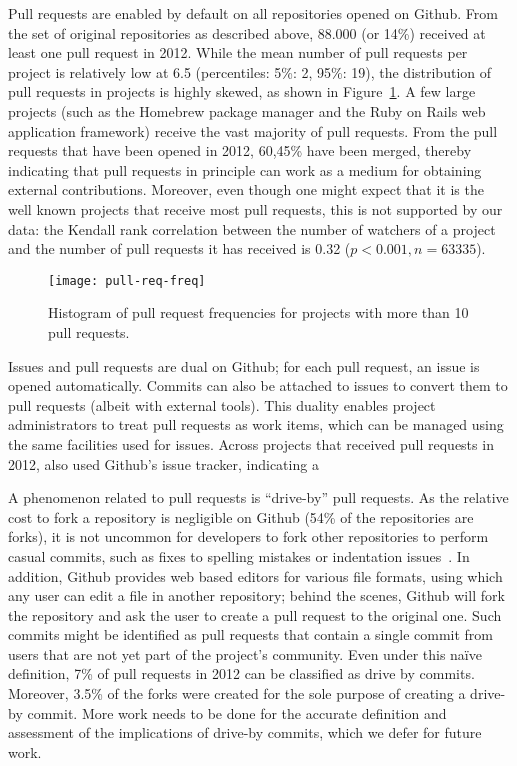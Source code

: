 \documentclass{sig-alternate}
\begin{document}
Pull requests are enabled by default on all repositories opened on Github.  From
the set of original repositories as described above, 88.000 (or 14\%) received
at least one pull request in 2012.  While the mean number of pull requests per
project is relatively low at 6.5 (percentiles: 5\%: 2, 95\%: 19), the
distribution of pull requests in projects is highly skewed, as shown in
Figure~\ref{fig:prfreq}.  A few large projects (such as the Homebrew package
manager and the Ruby on Rails web application framework) receive the vast
majority of pull requests. From the pull requests that have been opened in
2012, 60,45\% have been merged, thereby indicating that pull requests in
principle can work as a medium for obtaining external contributions.  Moreover,
even though one might expect that it is the well known projects that receive
most pull requests, this is not supported by our data: the Kendall rank
correlation between the number of watchers of a project and the number of pull
requests it has received is 0.32 ($p < 0.001, n = 63335$).

\begin{figure}
  \begin{center}
    \texttt{[image: pull-req-freq]}
  \end{center}
  \caption{Histogram of pull request frequencies for projects with more than
  10 pull requests.}
  \label{fig:prfreq}
\end{figure}

Issues and pull requests are dual on Github; for each pull request, an
issue is opened automatically. Commits can also be attached to issues to
convert them to pull requests (albeit with external tools). This duality
enables project administrators to treat pull requests as work items,
which can be managed using the same facilities used for issues.
Across projects that received pull requests in 2012,
\todo{}
also
used Github's issue tracker, indicating a 

A phenomenon related to pull requests is ``drive-by'' pull requests. As the
relative cost to fork a repository is negligible on Github (54\% of the
repositories are forks), it is not uncommon for developers to fork other
repositories to perform casual commits, such as fixes to spelling mistakes or
indentation issues~\cite{Pham13}. In addition, Github provides web based editors
for various file formats, using which any user can edit a file in another
repository; behind the scenes, Github will fork the repository and ask the user
to create a pull request to the original one. Such commits might be identified
as pull requests that contain a single commit from users that are not yet part
of the project's community. Even under this na\"ive definition, 7\% of pull
requests in 2012 can be classified as drive by commits. Moreover, 3.5\% of the
forks were created for the sole purpose of creating a drive-by commit.  More
work needs to be done for the accurate definition and assessment of the
implications of drive-by commits, which we defer for future work.
\end{document}
